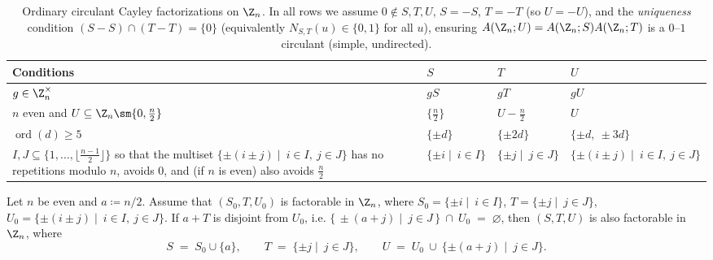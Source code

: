\documentclass{file}
\begin{document}
\begin{table}[H]
  \centering
  \caption{Ordinary circulant Cayley factorizations on $\Z_n$.
  In all rows we assume $0\notin S,T,U$, $S=-S$, $T=-T$ (so $U=-U$), and the
  \emph{uniqueness} condition $(S-S)\cap (T-T)=\{0\}$ (equivalently $N_{S,T}(u)\in\{0,1\}$ for all $u$), ensuring $A(\Z_n;U)=A(\Z_n;S)A(\Z_n;T)$ is a $0$–$1$ circulant (simple, undirected).}
  \label{tab:STU-Zn}
  \setlength{\tabcolsep}{8pt}
  \renewcommand{\arraystretch}{1.12}
  \begin{tabular}{@{}p{}p{}p{}p{}@{}}
    \toprule
    \textbf{Conditions} & \textbf{$S$} & \textbf{$T$} & \textbf{$U$} \\
    \midrule \midrule

    $g\in \Z_n^\times$ &$gS$ & $gT$ & $gU$ \\[2pt]

     $n$ even and $U\subseteq \Z_n\sm \{0,\tfrac n2\}$ &
    $\{\tfrac n2\}$ & $U-\tfrac n2$ & $U$ \\[2pt]

    $\operatorname{ord}(d)\ge 5$ &
    $\{\pm d\}$ & $\{\pm 2d\}$ & $\{\pm d,\ \pm 3d\}$ \\[2pt]

    $I,J\subseteq\{1,\dots,\lfloor\frac{n-1}{2}\rfloor\}$ so that the multiset
    $\{\pm(i\pm j)\mid \ i\in I,\ j\in J\}$ has no repetitions modulo $n$, avoids $0$, and (if $n$ is even) also avoids $\tfrac n2$ &
    $\{\pm i\mid \ i\in I\}$ & $\{\pm j\mid\ j\in J\}$ & $\{\pm(i\pm j)\mid \ i\in I,\ j\in J\}$ \\[2pt]
    \bottomrule
  \end{tabular}
  \vspace{0.6ex}
\end{table}
\begin{lem}\label{lem:antipode-augmentation}
Let $n$ be even and $a\coloneqq n/2$.
Assume that $(S_0, T , U_0 )$ is factorable in $\Z_n$,
where
$S_0=\{\pm i\mid \ i\in I\}$, $T=\{\pm j\mid\ j\in J\}$,
$U_0=\{\pm(i\pm j)\mid \ i\in I,\ j\in J\}$.
If $a+T$ is disjoint from $U_0$, i.e.
$\{\,\pm(a+j)\mid \ j\in J\,\}\ \cap\ U_0\;=\;\varnothing$,
then $(S, T , U )$ is also factorable in $\Z_n$, where
\[
S\;=\;S_0\cup\{a\},\qquad T\;=\;\{\pm j\mid\ j\in J\},\qquad
U\;=\;U_0\ \cup\ \{\pm(a+j)\mid\ j\in J\}.
\]
\end{lem}
\end{document}
